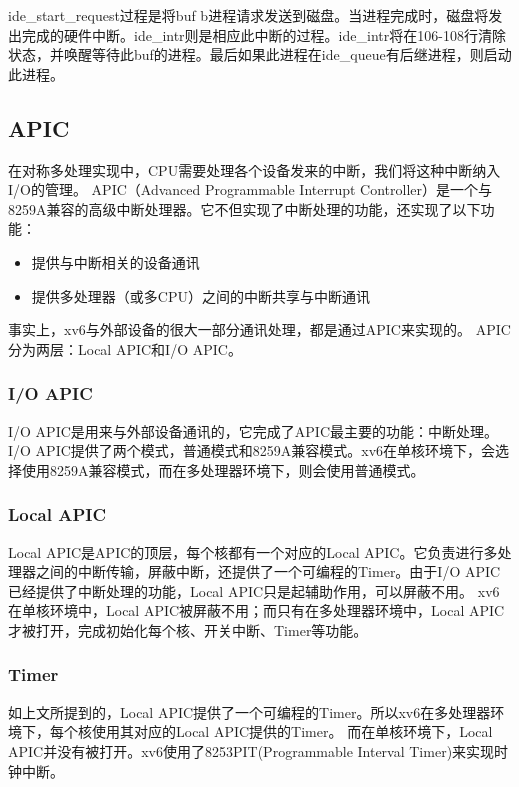 \documentclass[a4paper,12pt]{report}
\begin{document}
ide\_start\_request过程是将buf b进程请求发送到磁盘。当进程完成时，磁盘将发出完成的硬件中断。ide\_intr则是相应此中断的过程。ide\_intr将在106-108行清除状态，并唤醒等待此buf的进程。最后如果此进程在ide\_queue有后继进程，则启动此进程。
\subsection{APIC}
在对称多处理实现中，CPU需要处理各个设备发来的中断，我们将这种中断纳入I/O的管理。
APIC（Advanced Programmable Interrupt Controller）是一个与8259A兼容的高级中断处理器。它不但实现了中断处理的功能，还实现了以下功能：
\begin{itemize}
  \item 	提供与中断相关的设备通讯	
   \item  提供多处理器（或多CPU）之间的中断共享与中断通讯
\end{itemize}


事实上，xv6与外部设备的很大一部分通讯处理，都是通过APIC来实现的。
APIC分为两层：Local APIC和I/O APIC。
\subsubsection{I/O APIC}

I/O APIC是用来与外部设备通讯的，它完成了APIC最主要的功能：中断处理。
I/O APIC提供了两个模式，普通模式和8259A兼容模式。xv6在单核环境下，会选择使用8259A兼容模式，而在多处理器环境下，则会使用普通模式。
\subsubsection{Local APIC}
Local APIC是APIC的顶层，每个核都有一个对应的Local APIC。它负责进行多处理器之间的中断传输，屏蔽中断，还提供了一个可编程的Timer。由于I/O APIC已经提供了中断处理的功能，Local APIC只是起辅助作用，可以屏蔽不用。
xv6在单核环境中，Local APIC被屏蔽不用；而只有在多处理器环境中，Local APIC才被打开，完成初始化每个核、开关中断、Timer等功能。
\subsubsection{ Timer}
如上文所提到的，Local APIC提供了一个可编程的Timer。所以xv6在多处理器环境下，每个核使用其对应的Local APIC提供的Timer。
而在单核环境下，Local APIC并没有被打开。xv6使用了8253PIT(Programmable Interval Timer)来实现时钟中断。
\end{document}
